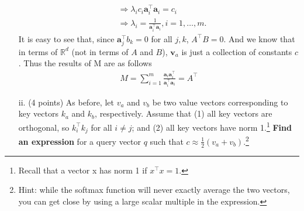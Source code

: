 \documentclass[letterpaper,12pt]{article}
\begin{document}
\begin{itemize}
{\begin{equation*}
\begin{aligned}
			&\Rightarrow \lambda_i c_i \mathbf{a}_i^\top \mathbf{a}_i = c_i \\
			&\Rightarrow \lambda_i = \frac{1}{\mathbf{a}_i^\top \mathbf{a}_i}, i=1,\ldots, m.
		\end{aligned}
		\label{eq: M_solution}
	\end{equation*}
	It is easy to see that, since $\mathbf{a}_j^\top b_k = 0$ for all $j, k$, $A^\top B = 0$. And we know that in terms of $\mathbb{R}^d$ (not in terms of $A$ and $B$), $\mathbf{v}_a$ is just a collection of constants $c$. Thus the results of M are as follows
	\begin{equation*}
		\begin{aligned}
			M = \sum_{i=1}^{m}\frac{\mathbf{a}_i \mathbf{a}_i^\top}{\mathbf{a}_i^\top \mathbf{a}_i} = A^\top
		\end{aligned}
	\label{eq: M_result}
 	\end{equation*}
	} 
			
			
	\item[ii.]
	(4 points) As before, let $v_a$ and $v_b$ be two value vectors corresponding to key vectors $k_a$ and $k_b$, respectively. Assume that (1) all key vectors are orthogonal, so $k_i^\top k_j$ for all $i \neq j$; and (2) all key vectors have norm 1.\footnote{Recall that a vector x has norm 1 if $x^{\top}x = 1$.} \textbf{Find an expression} for a query vector $q$ such that $c \approx \frac{1}{2}(v_a +v_b)$.\footnote{Hint: while the softmax function will never exactly average the two vectors, you can get close by using a large scalar multiple in the expression.}
	

\end{itemize}
\end{document}
